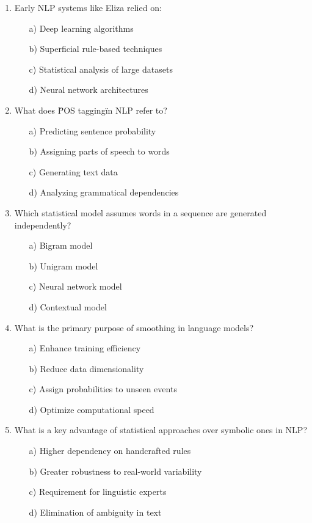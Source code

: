 \documentclass[8pt]{extarticle}
\begin{document}
\begin{multicols}{2}
\begin{enumerate}
\item Early NLP systems like Eliza relied on:
\begin{itemize}
    \item[a)] Deep learning algorithms
    \item[b)] Superficial rule-based techniques
    \item[c)] Statistical analysis of large datasets
    \item[d)] Neural network architectures
\end{itemize}

\item What does \"POS tagging\" in NLP refer to?
\begin{itemize}
    \item[a)] Predicting sentence probability
    \item[b)] Assigning parts of speech to words
    \item[c)] Generating text data
    \item[d)] Analyzing grammatical dependencies
\end{itemize}

\item Which statistical model assumes words in a sequence are generated independently?
\begin{itemize}
    \item[a)] Bigram model
    \item[b)] Unigram model
    \item[c)] Neural network model
    \item[d)] Contextual model
\end{itemize}

\item What is the primary purpose of smoothing in language models?
\begin{itemize}
    \item[a)] Enhance training efficiency
    \item[b)] Reduce data dimensionality
    \item[c)] Assign probabilities to unseen events
    \item[d)] Optimize computational speed
\end{itemize}

\item What is a key advantage of statistical approaches over symbolic ones in NLP?
\begin{itemize}
    \item[a)] Higher dependency on handcrafted rules
    \item[b)] Greater robustness to real-world variability
    \item[c)] Requirement for linguistic experts
    \item[d)] Elimination of ambiguity in text
\end{itemize}


\end{enumerate}
\end{multicols}
\end{document}
